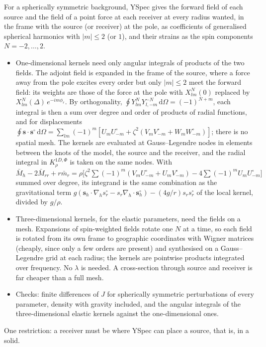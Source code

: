 \documentclass[11pt,a4paper]{article}
\newcommand{\bs}{\mathbf{s}}
\newcommand{\sd}{\mathbf{s}^\circ}
\newcommand{\dd}{\,\mathrm{d}}
\theoremstyle{remark}
\begin{document}
For a spherically symmetric background, YSpec gives the forward field of
each source and the field of a point force at each receiver at every radius
wanted, in the frame with the source (or receiver) at the pole, as
coefficients of generalised spherical harmonics with $|m|\le2$ (or $1$), and
their strains as the spin components $N=-2,\dots,2$.
\begin{itemize}
\item One-dimensional kernels need only angular integrals of products of the
  two fields. The adjoint field is expanded in the frame of the source, where
  a force away from the pole excites every order but only $|m|\le2$ meet the
  forward field: its weights are those of the force at the pole with
  $X^N_{lm}(0)$ replaced by $X^N_{lm}(\Delta)\,e^{-im\phi_r}$. By
  orthogonality, $\oint Y^N_{lm}Y^{-N}_{l,-m}\dd\Omega = (-1)^{N+m}$, each
  integral is then a sum over degree and order of products of radial
  functions, and for displacements $\oint\bs\cdot\sd\dd\Omega =
  \sum_{lm}(-1)^m[U_mU^\circ_{-m} + \zeta^2(V_mV^\circ_{-m} +
  W_mW^\circ_{-m})]$; there is no spatial mesh. The kernels are evaluated at
  Gauss--Legendre nodes in elements between the knots of the model, the
  source and the receiver, and the radial integral in $K^{1D,\Phi}_\rho$ is
  taken on the same nodes. With $\bar M_h - 2\bar M_{rr} + r\bar m_r =
  \rho\big[\zeta^2\sum(-1)^m(V_mU^\circ_{-m} + U_mV^\circ_{-m}) -
  4\sum(-1)^mU_mU^\circ_{-m}\big]$ summed over degree, its integrand is the
  same combination as the gravitational term $g(\bs_h\cdot\nabla_hs^\circ_r
  - s_r\nabla_h\cdot\sd_h) - (4g/r)s_rs^\circ_r$ of the local kernel, divided
  by $g/\rho$.
\item Three-dimensional kernels, for the elastic parameters, need the
  fields on a mesh. Expansions of spin-weighted fields rotate one $N$ at a
  time, so each field is rotated from its own frame to geographic
  coordinates with Wigner matrices (cheaply, since only a few orders are
  present) and synthesised on a Gauss--Legendre grid at each radius; the
  kernels are pointwise products integrated over frequency. No $\lambda$ is
  needed. A cross-section through source and receiver is far cheaper than a
  full mesh.
\item Checks: finite differences of $J$ for spherically symmetric
  perturbations of every parameter, density with gravity included, and the
  angular integrals of the three-dimensional elastic kernels against the
  one-dimensional ones.
\end{itemize}
One restriction: a receiver must be where YSpec can place a source, that is,
in a solid.
\end{document}
